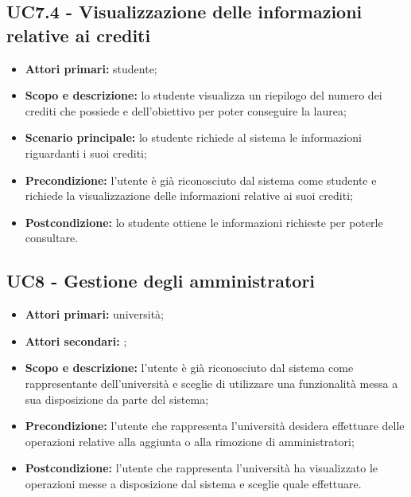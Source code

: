 \documentclass[AnalisiDeiRequisiti.tex]{subfiles}
\begin{document}
\subsection{UC7.4 - Visualizzazione delle informazioni relative ai crediti}
\begin{itemize}
	\item \textbf{Attori primari:} studente;
	\item \textbf{Scopo e descrizione:} lo studente visualizza un riepilogo del numero dei crediti che possiede e dell'obiettivo per poter conseguire la laurea;
	\item \textbf{Scenario principale:} lo studente richiede al sistema le informazioni riguardanti i suoi crediti;
	\item \textbf{Precondizione:} l'utente è già riconosciuto dal sistema come studente e richiede la visualizzazione delle informazioni relative ai suoi crediti;
	\item \textbf{Postcondizione:} lo studente ottiene le informazioni richieste per poterle consultare.
\end{itemize}
\subsection{UC8 - Gestione degli amministratori}
\begin{itemize}
	\item \textbf{Attori primari:} università;
	\item \textbf{Attori secondari:} ;
	\item \textbf{Scopo e descrizione:} l'utente è già riconosciuto dal sistema come rappresentante dell'università e sceglie di utilizzare una funzionalità messa a sua disposizione da parte del sistema;
	\item \textbf{Precondizione:} l'utente che rappresenta l'università desidera effettuare delle operazioni relative alla aggiunta o alla rimozione di amministratori;
	\item \textbf{Postcondizione:} l'utente che rappresenta l'università ha visualizzato le operazioni messe a disposizione dal sistema e sceglie quale effettuare.
\end{itemize}
\end{document}
